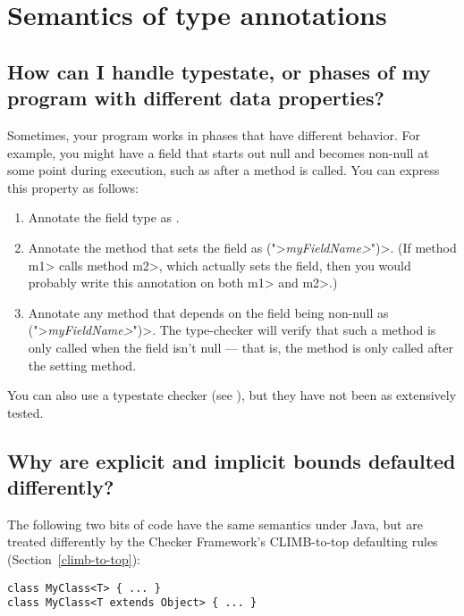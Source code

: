 \section{Semantics of type annotations\label{faq-semantics-section}}


\subsection{How can I handle typestate, or phases of my program with different data properties?\label{faq-typestate}}

Sometimes, your program works in phases that have different behavior.  For
example, you might have a field that starts out null and becomes non-null
at some point during execution, such as after a method is called.  You can
express this property as follows:

\begin{enumerate}
\item
Annotate the field type as .
\item
Annotate the method that sets the field as \<(">\emph{\<myFieldName>}\<")>.
(If method \<m1> calls method \<m2>, which actually sets the field, then
you would probably write this annotation on both \<m1> and \<m2>.)
\item
Annotate any method that depends on the field being non-null as
\<(">\emph{\<myFieldName>}\<")>.
The type-checker will verify that such a method is only called when the
field isn't null --- that is, the method is only called after the setting
method.
\end{enumerate}

You can also use a typestate checker (see
), but they have not been as extensively
tested.


\subsection{Why are explicit and implicit bounds defaulted differently?\label{faq-implicit-bounds}}

The following two bits of code have the same semantics under Java, but are
treated differently by the Checker Framework's CLIMB-to-top defaulting
rules (Section~\ref{climb-to-top}):

\begin{Verbatim}
class MyClass<T> { ... }
class MyClass<T extends Object> { ... }
\end{Verbatim}

